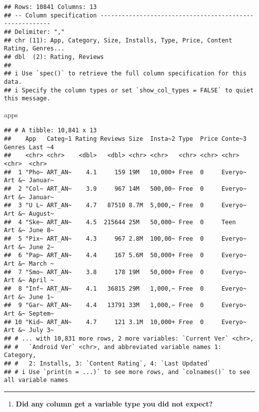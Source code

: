 \documentclass[
]{article}
\newenvironment{Shaded}{\begin{snugshade}}{\end{snugshade}}
\newcommand{\NormalTok}[1]{#1}
\providecommand{\tightlist}{%
  \setlength{\itemsep}{0pt}\setlength{\parskip}{0pt}}
\begin{document}
\begin{verbatim}
## Rows: 10841 Columns: 13
## -- Column specification --------------------------------------------------------
## Delimiter: ","
## chr (11): App, Category, Size, Installs, Type, Price, Content Rating, Genres...
## dbl  (2): Rating, Reviews
## 
## i Use `spec()` to retrieve the full column specification for this data.
## i Specify the column types or set `show_col_types = FALSE` to quiet this message.
\end{verbatim}

\begin{Shaded}
\begin{Highlighting}[]
\NormalTok{apps}
\end{Highlighting}
\end{Shaded}

\begin{verbatim}
## # A tibble: 10,841 x 13
##    App   Categ~1 Rating Reviews Size  Insta~2 Type  Price Conte~3 Genres Last ~4
##    <chr> <chr>    <dbl>   <dbl> <chr> <chr>   <chr> <chr> <chr>   <chr>  <chr>  
##  1 "Pho~ ART_AN~    4.1     159 19M   10,000+ Free  0     Everyo~ Art &~ Januar~
##  2 "Col~ ART_AN~    3.9     967 14M   500,00~ Free  0     Everyo~ Art &~ Januar~
##  3 "U L~ ART_AN~    4.7   87510 8.7M  5,000,~ Free  0     Everyo~ Art &~ August~
##  4 "Ske~ ART_AN~    4.5  215644 25M   50,000~ Free  0     Teen    Art &~ June 8~
##  5 "Pix~ ART_AN~    4.3     967 2.8M  100,00~ Free  0     Everyo~ Art &~ June 2~
##  6 "Pap~ ART_AN~    4.4     167 5.6M  50,000+ Free  0     Everyo~ Art &~ March ~
##  7 "Smo~ ART_AN~    3.8     178 19M   50,000+ Free  0     Everyo~ Art &~ April ~
##  8 "Inf~ ART_AN~    4.1   36815 29M   1,000,~ Free  0     Everyo~ Art &~ June 1~
##  9 "Gar~ ART_AN~    4.4   13791 33M   1,000,~ Free  0     Everyo~ Art &~ Septem~
## 10 "Kid~ ART_AN~    4.7     121 3.1M  10,000+ Free  0     Everyo~ Art &~ July 3~
## # ... with 10,831 more rows, 2 more variables: `Current Ver` <chr>,
## #   `Android Ver` <chr>, and abbreviated variable names 1: Category,
## #   2: Installs, 3: `Content Rating`, 4: `Last Updated`
## # i Use `print(n = ...)` to see more rows, and `colnames()` to see all variable names
\end{verbatim}

\begin{center}\rule{0.5\linewidth}{0.5pt}\end{center}

\begin{enumerate}
\def\labelenumi{\arabic{enumi}.}
\setcounter{enumi}{6}
\tightlist
\item
  \textbf{Did any column get a variable type you did not expect?}
\end{enumerate}
\end{document}
